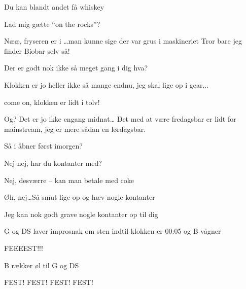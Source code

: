 \documentclass[a4paper,11pt]{article}
\begin{document}
\begin{sketch}
Du kan blandt andet få whiskey

Lad mig gætte “on the rocks”?

Nææ, fryseren er i \ldots man kunne sige der var grus i maskineriet
 Tror bare jeg finder Biobar selv så!


 Der er godt nok ikke så meget gang i dig hva?

 Klokken er jo heller ikke så mange endnu, jeg skal lige op i gear...

 come on, klokken er lidt i tolv!

Og? Det er jo ikke engang midnat… Det med at være fredagsbar er lidt for mainstream, jeg er mere sådan en lørdagsbar. 

 Så i åbner først imorgen? 

Nej nej, har du kontanter med?

 Nej, desværre -- kan man betale med coke

Øh, nej\ldots Så smut lige op og hæv nogle kontanter

 Jeg kan nok godt grave nogle kontanter op til dig

\scene G og DS laver improsnak om sten indtil klokken er 00:05 og B vågner

 FEEEEST!!!

\scene B rækker øl til G og DS

 FEST! FEST! FEST! FEST!


\end{sketch}
\end{document}
